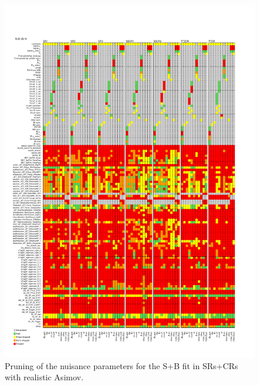 \begin{figure}[htbp]
	\centering
	\includegraphics[width=.85\textwidth]{Chapters/CH8/figures/SPLUSB_CRSR_UsingDL1rcFullSys/Pruning}
	\caption{Pruning of the nuisance parameters for the S+B \tZc fit in SRs+CRs with realistic Asimov.}%
	\label{fig:stat:tzc:splusb:crsr:pruning}
\end{figure}


